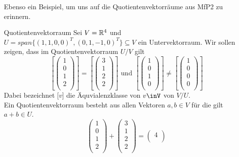 Ebenso ein Beispiel, um uns auf die Quotientenvektorräume aus MfP2 zu erinnern.
\begin{Beispiel}{Quotientenvektorraum}
    Sei $V=\R^4$ und $U=span\{(1,1,0,0)^T, (0,1,-1,0)^T\}\subseteq V$ ein Untervektorraum. Wir sollen zeigen, dass im Quotientenvektorraum $U/V$ gilt
    $$[\begin{pmatrix}
        1 \\
        0 \\
        1 \\
        2 \\
    \end{pmatrix}]=[\begin{pmatrix}
        3 \\
        1 \\
        2 \\
        2 \\
    \end{pmatrix}] \mbox{ und }[\begin{pmatrix}
        1 \\
        0 \\
        1 \\
        0 \\
    \end{pmatrix}]\neq[\begin{pmatrix}
        1 \\
        0 \\
        0 \\
        0 \\
    \end{pmatrix}]$$
    Dabei bezeichnet [$v$] die Äquvialenzklasse von $v\inV$ von $V/U$. \\
    Ein Quotientenvektorraum besteht aus allen Vektoren $a,b\in V$ für die gilt $a+b\in U$.
    $$\begin{pmatrix}
        1 \\
        0 \\
        1 \\
        2 \\
    \end{pmatrix}+\begin{pmatrix}
        3 \\
        1 \\
        2 \\
        2 \\
    \end{pmatrix}=\begin{pmatrix}
        4 \\

\end{pmatrix}$$
\end{Beispiel}
